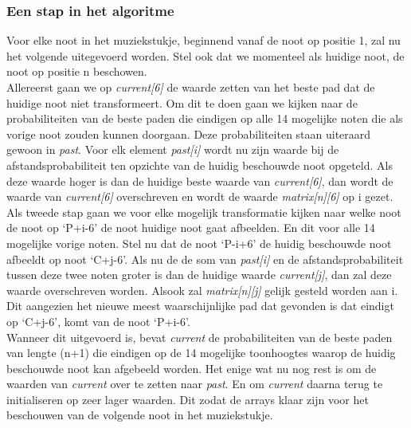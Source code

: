 \subsubsection{Een stap in het algoritme}
Voor elke noot in het muziekstukje, beginnend vanaf de noot op positie 1, zal nu het volgende uitegevoerd worden. Stel ook dat we momenteel als huidige noot, de noot op positie n beschowen.\\ 
Allereerst gaan we op \textit{current[6]} de waarde zetten van het beste pad dat de huidige noot niet transformeert. Om dit te doen gaan we kijken naar de probabiliteiten van de beste paden die eindigen op alle 14 mogelijke noten die als vorige noot zouden kunnen doorgaan. Deze probabiliteiten staan uiteraard gewoon in \textit{past}. Voor elk element \textit{past[i]} wordt nu zijn waarde bij de afstandsprobabiliteit ten opzichte van de huidig beschouwde noot opgeteld. Als deze waarde hoger is dan de huidige beste waarde van \textit{current[6]}, dan wordt de waarde van \textit{current[6]} overschreven en wordt de waarde \textit{matrix[n][6]} op i gezet.
Als tweede stap gaan we voor elke mogelijk transformatie kijken naar welke noot de noot op `P+i-6' de noot huidige noot gaat afbeelden. En dit voor alle 14 mogelijke vorige noten. Stel nu dat de noot `P-i+6' de huidig beschouwde noot afbeeldt op noot `C+j-6'. Als nu de de som van \textit{past[i]} en de afstandsprobabiliteit tussen deze twee noten groter is dan de huidige waarde \textit{current[j]}, dan zal deze waarde overschreven worden. Alsook zal \textit{matrix[n][j]} gelijk gesteld worden aan i. Dit aangezien het nieuwe meest waarschijnlijke pad dat gevonden is dat eindigt op `C+j-6', komt van de noot `P+i-6'.\\
Wanneer dit uitgevoerd is, bevat \textit{current} de probabiliteiten van de beste paden van lengte (n+1) die eindigen op de 14 mogelijke toonhoogtes waarop de huidig beschouwde noot kan afgebeeld worden.
Het enige wat nu nog rest is om de waarden van \textit{current} over te zetten naar \textit{past}. En om \textit{current} daarna terug te initialiseren op zeer lager waarden. Dit zodat de arrays klaar zijn voor het beschouwen van de volgende noot in het muziekstukje. 

